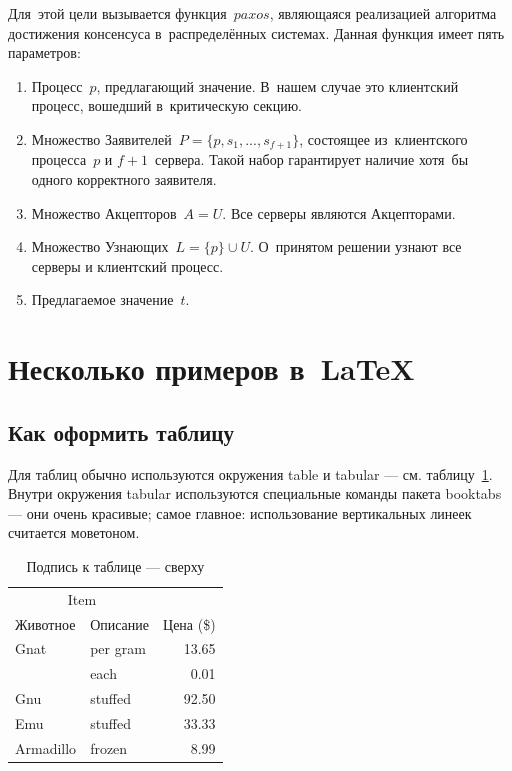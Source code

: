 Для~этой цели вызывается функция~$paxos$, являющаяся реализацией алгоритма достижения консенсуса в~распределённых системах. Данная функция имеет пять параметров: 
\begin{enumerate}
	\item Процесс~$p$, предлагающий значение. В~нашем случае это клиентский процесс, вошедший в~критическую секцию.
	\item Множество Заявителей~$P = \{p, s_1, ..., s_{f+1}\}$, состоящее из~клиентского процесса~$p$ и $f + 1$~сервера. Такой набор гарантирует наличие хотя~бы одного корректного заявителя.
	\item Множество Акцепторов~$A = U$. Все серверы являются Акцепторами.
	\item Множество Узнающих~$L = \{p\} \cup U$. О~принятом решении узнают все серверы и клиентский процесс.
	\item Предлагаемое значение~$t$.
\end{enumerate}

\fi

\section{Несколько примеров в~\LaTeX{}}
\label{sec:examples}
\subsection{Как оформить таблицу}
Для таблиц обычно используются окружения table и tabular --- см. таблицу~\ref{tab:widgets}. Внутри окружения tabular используются специальные команды пакета booktabs — они очень красивые; самое главное: использование вертикальных линеек считается моветоном.
\begin{table}
\centering
\caption{\label{tab:widgets}Подпись к таблице --- сверху}
\begin{tabular}{llr}
\toprule
\multicolumn{2}{c}{Item} \\
\cmidrule(r){1-2}
Животное  & Описание    & Цена (\$) \\
\midrule
Gnat      & per gram    & 13.65      \\
          & each        & 0.01       \\
Gnu       & stuffed     & 92.50      \\
Emu       & stuffed     & 33.33      \\
Armadillo & frozen      & 8.99       \\
\bottomrule
\end{tabular}
\end{table}

\fi


